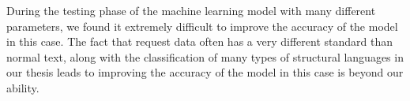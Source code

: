 During the testing phase of the machine learning model with many different parameters, we found it extremely difficult to improve the accuracy of the model in this case. The fact that request data often has a very different standard than normal text, along with the classification of many types of structural languages in our thesis leads to improving the accuracy of the model in this case is beyond our ability.

	


